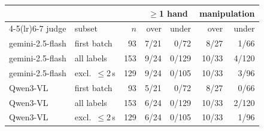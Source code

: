 \begin{tabular}{@{}llrrrrr@{}}
\toprule
& & & \multicolumn{2}{c}{$\geq$1 hand} & \multicolumn{2}{c}{manipulation} \\
\cmidrule(lr){4-5}\cmidrule(lr){6-7}
judge & subset & $n$ & over & under & over & under \\
\midrule
gemini-2.5-flash & first batch & 93 & 7/21 & 0/72 & 8/27 & 1/66 \\
gemini-2.5-flash & all labels & 153 & 9/24 & 0/129 & 10/33 & 4/120 \\
gemini-2.5-flash & excl.\ $\leq$2\,s & 129 & 9/24 & 0/105 & 10/33 & 3/96 \\
\midrule
Qwen3-VL & first batch & 93 & 5/21 & 0/72 & 8/27 & 0/66 \\
Qwen3-VL & all labels & 153 & 6/24 & 0/129 & 10/33 & 2/120 \\
Qwen3-VL & excl.\ $\leq$2\,s & 129 & 6/24 & 0/105 & 10/33 & 1/96 \\
\bottomrule
\end{tabular}
